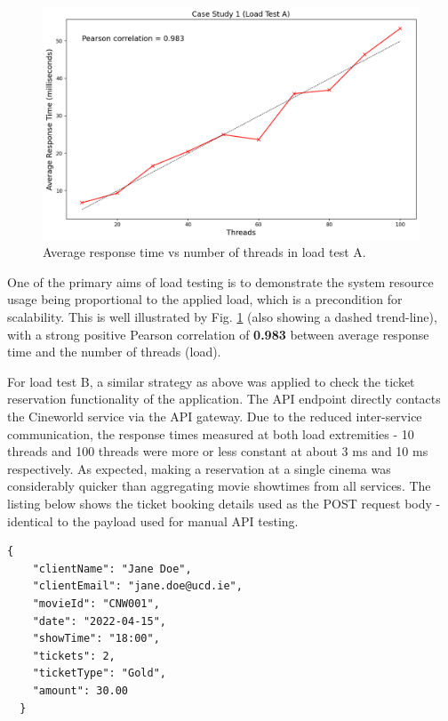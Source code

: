 \begin{figure}[H]
  \centering
  \includegraphics[width=0.8\linewidth]{./assets/images/case-study-01/cs01-lta-4.png}
  \caption{Average response time vs number of threads in load test A.}
  \label{fig:cs01-lta-4}
\end{figure}

One of the primary aims of load testing is to demonstrate the system resource usage being proportional to the applied load, which is a precondition for scalability. This is well illustrated by Fig. \ref{fig:cs01-lta-4} (also showing a dashed trend-line), with a strong positive Pearson correlation of \textbf{0.983} between average response time and the number of threads (load).

For load test B, a similar strategy as above was applied to check the ticket reservation functionality of the application. The API endpoint  directly contacts the Cineworld service via the API gateway. Due to the reduced inter-service communication, the response times measured at both load extremities - 10 threads and 100 threads were more or less constant at about 3 ms and 10 ms respectively. As expected, making a reservation at a single cinema was considerably quicker than aggregating movie showtimes from all services. The listing below shows the ticket booking details used as the POST request body - identical to the payload used for manual API testing.

\begin{lstlisting}[caption=Dummy payload for load test B POST request.]
  {
    "clientName": "Jane Doe",
    "clientEmail": "jane.doe@ucd.ie",
    "movieId": "CNW001",
    "date": "2022-04-15",
    "showTime": "18:00",
    "tickets": 2,
    "ticketType": "Gold",
    "amount": 30.00
  }
\end{lstlisting}


